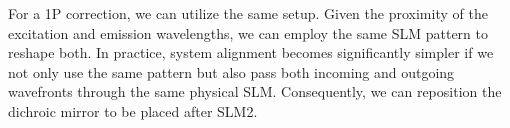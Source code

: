 %

For a 1P correction, we can utilize the same setup. Given the proximity of the excitation and emission wavelengths, we can employ the same SLM pattern to reshape both. In practice, system alignment becomes significantly simpler if we not only use the same pattern but also pass both incoming and outgoing wavefronts through the same physical SLM. Consequently, we can reposition the dichroic mirror to be placed after SLM2.



